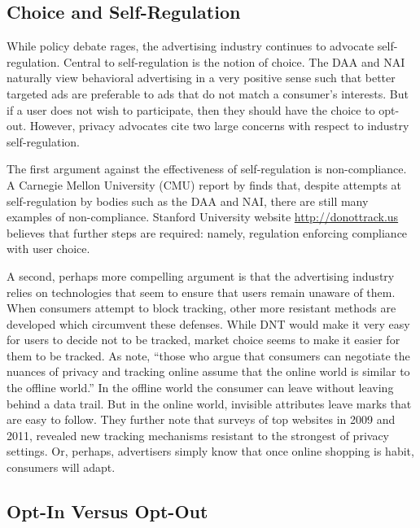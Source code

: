 \subsection{Choice and Self-Regulation}
\label{choiceandself-regulation}

While policy debate rages, the advertising industry continues to advocate self-regulation. Central to self-regulation is the notion of choice. The DAA and NAI naturally view behavioral advertising in a very positive sense such that better targeted ads are preferable to ads that do not match a consumer's interests. But if a user does not wish to participate, then they should have the choice to opt-out. However, privacy advocates cite two large concerns with respect to industry self-regulation.

The first argument against the effectiveness of self-regulation is non-compliance. A Carnegie Mellon University (CMU) report by  \cite*{Komanduri:2012wo}  finds that, despite attempts at self-regulation by bodies such as the DAA and NAI, there are still many examples of non-compliance. Stanford University website  \url{http://donottrack.us}  believes that further steps are required: namely, regulation enforcing compliance with user choice. 

A second, perhaps more compelling argument is that the advertising industry relies on technologies that seem to ensure that users remain unaware of them. When consumers attempt to block tracking, other more resistant methods are developed which circumvent these defenses. While DNT would make it very easy for users to decide not to be tracked, market choice seems to make it easier for them to be tracked. As  \cite*{Hoofnagle:2012ve}  note, ``those who argue that consumers can negotiate the nuances of privacy and tracking online assume that the online world is similar to the offline world.'' In the offline world the consumer can leave without leaving behind a data trail. But in the online world, invisible attributes leave marks that are easy to follow. They further note that surveys of top websites in 2009 and 2011, revealed new tracking mechanisms resistant to the strongest of privacy settings. Or, perhaps, advertisers simply know that once online shopping is habit, consumers will adapt.

\subsection{Opt-In Versus Opt-Out}
\label{opt-inversusopt-out}

